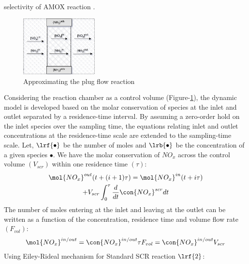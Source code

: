 selectivity of AMOX reaction \cite{jain2023diagnostics}.
\begin{figure}[ht]
    \centering
    \includegraphics[width=0.35\textwidth]{figs/2_mdl/plug_flow_discrete.png}
    \caption{Approximating the plug flow reaction}
    \label{fig:plug-flow}
\end{figure}
Considering the reaction chamber as a control volume (Figure-\ref{fig:plug-flow}), the dynamic model is developed based
on the molar conservation of species at the inlet and outlet separated by a residence-time interval. By assuming a
zero-order hold on the inlet species over the sampling time, the equations relating inlet and outlet concentrations at
the residence-time scale are extended to the sampling-time scale.
Let, $\lrf{\bullet}$ be the number of moles and $\lrb{\bullet}$ be the concentration of a given species $\bullet$. We have the molar conservation of $NO_x$ across the control volume $(V_{scr})$ within one residence time $(\tau)$:
\begin{multline}
        \mol{NO_x}^{out} (t + (i+1) \tau) =
                \mol{NO_x}^{in} (t + i \tau) \\
                + V_{scr} \int_0^{\tau} \frac{d}{dt} \con{NO_x}^{scr}dt
        \label{eqn::nox_bal}
\end{multline}
The number of moles entering at the inlet and leaving at the outlet can be written as a function of the concentration, residence time and volume flow rate $(F_{vol})$:
\begin{align}
    \mol{NO_x}^{in/out} = \con{NO_x}^{in/out} \tau F_{vol} = \con{NO_x}^{in/out} V_{scr}
\end{align}
Using Eiley-Rideal mechanism for Standard SCR reaction $\lrf{2}$:
